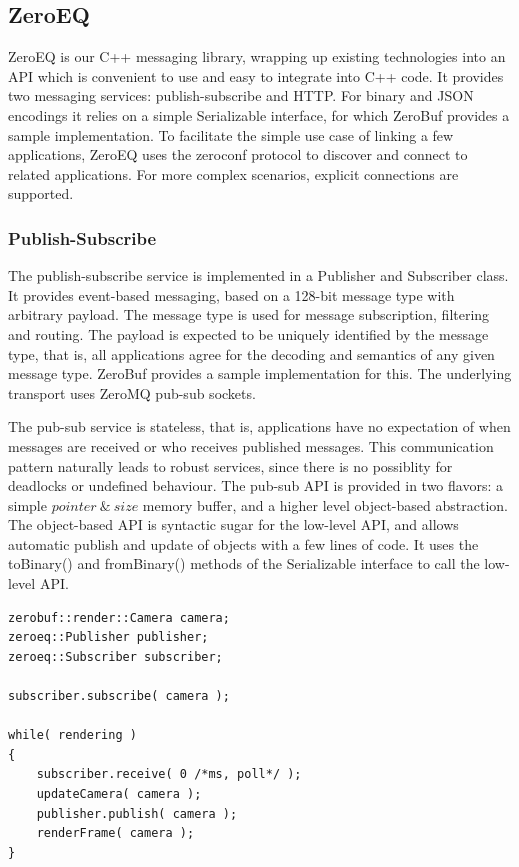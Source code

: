 \documentclass[10pt]{llncs}
\begin{document}
\subsection{ZeroEQ}

ZeroEQ is our C++ messaging library, wrapping up existing technologies into an
API which is convenient to use and easy to integrate into C++ code. It provides
two messaging services: publish-subscribe and HTTP. For binary and JSON
encodings it relies on a simple \textsf{Serializable} interface, for which
ZeroBuf provides a sample implementation. To facilitate the simple use case of
linking a few applications, ZeroEQ uses the zeroconf protocol to discover and
connect to related applications. For more complex scenarios, explicit
connections are supported.

\subsubsection{Publish-Subscribe}

The publish-subscribe service is implemented in a \textsf{Publisher} and
\textsf{Subscriber} class. It provides event-based messaging, based on a 128-bit
message type with arbitrary payload. The message type is used for message
subscription, filtering and routing. The payload is expected to be uniquely
identified by the message type, that is, all applications agree for the decoding
and semantics of any given message type. ZeroBuf provides a sample
implementation for this. The underlying transport uses ZeroMQ pub-sub sockets.

The pub-sub service is stateless, that is, applications have no expectation of
when messages are received or who receives published messages. This
communication pattern naturally leads to robust services, since there is no
possiblity for deadlocks or undefined behaviour. The pub-sub API is provided in
two flavors: a simple $pointer\ \&\ size$ memory buffer, and a higher level
object-based abstraction. The object-based API is syntactic sugar for the
low-level API, and allows automatic publish and update of objects with a few
lines of code. It uses the \textsf{toBinary()} and \textsf{fromBinary()} methods
of the \textsf{Serializable} interface to call the low-level API.

\begin{lstlisting}[float, caption=Publish-Subscribe Example, label=lPubSub]
zerobuf::render::Camera camera;
zeroeq::Publisher publisher;
zeroeq::Subscriber subscriber;

subscriber.subscribe( camera );

while( rendering )
{
    subscriber.receive( 0 /*ms, poll*/ );
    updateCamera( camera );
    publisher.publish( camera );
    renderFrame( camera );
}
\end{lstlisting}
\end{document}
